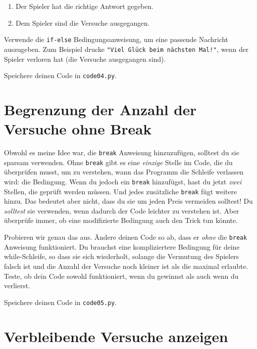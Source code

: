 \documentclass[
]{book}
\providecommand{\tightlist}{%
  \setlength{\itemsep}{0pt}\setlength{\parskip}{0pt}}
\begin{document}
\begin{enumerate}
\def\labelenumi{\arabic{enumi}.}
\tightlist
\item
  Der Spieler hat die richtige Antwort gegeben.
\item
  Dem Spieler sind die Versuche ausgegangen.
\end{enumerate}

Verwende die \texttt{if-else} Bedingungsanweisung, um eine passende Nachricht auszugeben. Zum Beispiel drucke \texttt{"Viel\ Glück\ beim\ nächsten\ Mal!"}, wenn der Spieler verloren hat (die Versuche ausgegangen sind).

Speichere deinen Code in \texttt{code04.py}.

\hypertarget{begrenzung-der-anzahl-der-versuche-ohne-break}{%
\section{Begrenzung der Anzahl der Versuche ohne Break}\label{begrenzung-der-anzahl-der-versuche-ohne-break}}

Obwohl es meine Idee war, die \texttt{break} Anweisung hinzuzufügen, solltest du sie sparsam verwenden. Ohne \texttt{break} gibt es eine \emph{einzige} Stelle im Code, die du überprüfen musst, um zu verstehen, wann das Programm die Schleife verlassen wird: die Bedingung. Wenn du jedoch ein \texttt{break} hinzufügst, hast du jetzt \emph{zwei} Stellen, die geprüft werden müssen. Und jedes zusätzliche \texttt{break} fügt weitere hinzu. Das bedeutet aber nicht, dass du sie um jeden Preis vermeiden solltest! Du \emph{solltest} sie verwenden, wenn dadurch der Code leichter zu verstehen ist. Aber überprüfe immer, ob eine modifizierte Bedingung auch den Trick tun könnte.

Probieren wir genau das aus. Ändere deinen Code so ab, dass er \emph{ohne} die \texttt{break} Anweisung funktioniert. Du brauchst eine kompliziertere Bedingung für deine while-Schleife, so dass sie sich wiederholt, solange die Vermutung des Spielers falsch ist und die Anzahl der Versuche noch kleiner ist als die maximal erlaubte. Teste, ob dein Code sowohl funktioniert, wenn du gewinnst als auch wenn du verlierst.

Speichere deinen Code in \texttt{code05.py}.

\hypertarget{verbleibende-versuche-anzeigen}{%
\section{Verbleibende Versuche anzeigen}\label{verbleibende-versuche-anzeigen}}
\end{document}
